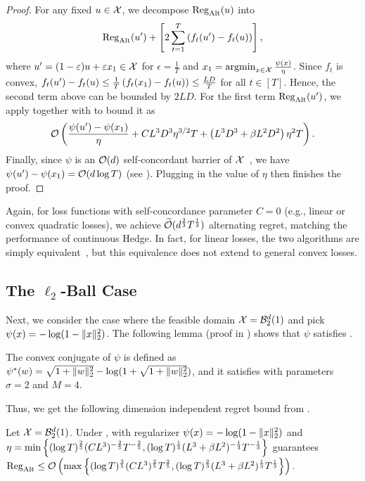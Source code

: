 \begin{proof}
    For any fixed $u\in{\mathcal{X}}$, we decompose $\mathrm{Reg}_{\mathrm{Alt}}(u)$ into 
    \begin{equation}\label{eqn:reg_decompose}
        \mathrm{Reg}_{\mathrm{Alt}}(u')+\left[2\sum_{t=1}^T\left(f_t(u')-f_t(u)\right)\right],
    \end{equation}
    where $u'=(1-\varepsilon)u+\varepsilon x_1\in{\mathcal{X}}$ for $\epsilon=\frac{1}{T}$ and $x_1 = \operatorname*{argmin}_{x\in{\mathcal{X}}}\frac{\psi(x)}{\eta}$. Since $f_t$ is convex, $f_t(u')-f_t(u) \le \frac{1}{T}\left(f_t(x_1)-f_t(u)\right)\le \frac{LD}{T}$ for all $t\in[T]$. Hence, the second term above can be bounded by $2LD$.
    For the first term $\mathrm{Reg}_{\mathrm{Alt}}(u')$, we apply  together with  to bound it as
    \begin{equation}\label{eqn:reg_u'_bound}
         \mathcal{O}\left(\frac{\psi(u')-\psi(x_1)}{\eta}+CL^3D^3\eta^{3/2}T+\left(L^3D^3+\beta L^2D^2\right)\eta^2 T\right).
    \end{equation}
Finally, since $\psi$ is an $\mathcal{O}(d)$ self-concordant barrier of ${\mathcal{X}}$~\citep{bubeck2014entropic,chewi2023entropic}, we have $\psi(u')-\psi(x_1)= \mathcal{O}(d\log T)$ (see ).
Plugging in the value of $\eta$ then finishes the proof.
\end{proof}
%
Again, for loss functions with self-concordance parameter $C=0$ (e.g., linear or convex quadratic losses), we achieve  $\widetilde{\mathcal{O}}(d^\frac{2}{3}T^\frac{1}{3})$ alternating regret, matching the performance of continuous Hedge.
In fact, for linear losses, the two algorithms are simply equivalent~\citep{bubeck2014entropic}, but this equivalence does not extend to general  convex losses.

\subsection{The $\ell_2$-Ball Case}\label{sec:ball}


Next, we consider the case where the feasible domain ${\mathcal{X}}={\mathcal{B}}_2^d(1)$ and pick $\psi(x) = -\log(1-\lVert x\rVert_2^2)$. 
The following lemma (proof in ) shows that $\psi$ satisfies .

\begin{lemma}\label{lem:smoothness of ball case}
    The convex conjugate of $\psi$ is   defined as
    $\psi^*(w) = \sqrt{1+\lVert w\rVert_2^2} - \log(1+\sqrt{1+\lVert w\rVert_2^2})$,
    and it satisfies  with parameters $\sigma = 2$ and $M=4$.
\end{lemma}
%
Thus, we get the following dimension independent regret bound from .
%
\begin{corollary}\label{cor:ball}
    Let ${\mathcal{X}}={\mathcal{B}}_2^d(1)$. Under ,  with regularizer $\psi(x) = -\log(1-\lVert x\rVert_2^2)$ and $\eta=\min\left\{(\log T)^{\frac{2}{5}}(CL^3)^{-\frac{2}{5}}T^{-\frac{2}{5}},(\log T)^{\frac{1}{3}}(L^3+\beta L^2)^{-\frac{1}{3}}T^{-\frac{1}{3}}\right\}$ guarantees
    $
    \mathrm{Reg}_{\mathrm{Alt}}\le \mathcal{O}\left(\max\left\{(\log T)^{\frac{3}{5}}(CL^3)^{\frac{2}{5}}T^{\frac{2}{5}},(\log T)^{\frac{2}{3}}(L^3+\beta L^2)^{\frac{1}{3}}T^{\frac{1}{3}}\right\}\right).
    $
\end{corollary}

